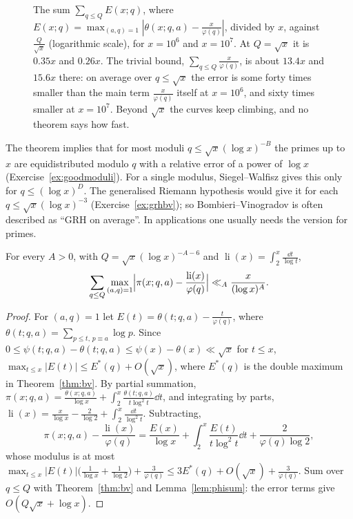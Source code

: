 \begin{figure}[ht]
\centering
{}
\caption{The sum $\sum_{q\le Q}E(x;q)$, where $E(x;q)=\max_{(a,q)=1}|\theta(x;q,a)-\frac x{\varphi(q)}|$, divided by $x$, against $\frac Q{\sqrt x}$ (logarithmic scale), for $x=10^6$ and $x=10^7$. At $Q=\sqrt x$ it is $0.35x$ and $0.26x$. The trivial bound, $\sum_{q\le Q}\frac x{\varphi(q)}$, is about $13.4x$ and $15.6x$ there: on average over $q\le\sqrt x$ the error is some forty times smaller than the main term $\frac x{\varphi(q)}$ itself at $x=10^6$, and sixty times smaller at $x=10^7$. Beyond $\sqrt x$ the curves keep climbing, and no theorem says how fast.}
\label{fig:bv}
\end{figure}

The theorem implies that for most moduli $q\le\sqrt x(\log x)^{-B}$ the primes up to $x$ are equidistributed modulo $q$ with a relative error of a power of $\log x$ (Exercise~\ref{ex:goodmoduli}). For a single modulus, Siegel--Walfisz gives this only for $q\le(\log x)^D$. The generalised Riemann hypothesis would give it for each $q\le\sqrt x(\log x)^{-3}$ (Exercise~\ref{ex:grhbv}); so Bombieri--Vinogradov is often described as ``GRH on average''. In applications one usually needs the version for primes.

\begin{corollary}\label{cor:bvpi}
For every $A>0$, with $Q=\sqrt x(\log x)^{-A-6}$ and $\operatorname{li}(x)=\int_2^x\frac{\dd t}{\log t}$,
\[
\sum_{q\le Q}\max_{(a,q)=1}\Bigl|\pi(x;q,a)-\frac{\operatorname{li}(x)}{\varphi(q)}\Bigr|\ll_A\frac x{(\log x)^A}.
\]
\end{corollary}
\begin{proof}
For $(a,q)=1$ let $E(t)=\theta(t;q,a)-\frac t{\varphi(q)}$, where $\theta(t;q,a)=\sum_{p\le t,\,p\equiv a}\log p$. Since $0\le\psi(t;q,a)-\theta(t;q,a)\le\psi(x)-\theta(x)\ll\sqrt x$ for $t\le x$, $\max_{t\le x}|E(t)|\le E^*(q)+O(\sqrt x)$, where $E^*(q)$ is the double maximum in Theorem~\ref{thm:bv}. By partial summation,
$\pi(x;q,a)=\frac{\theta(x;q,a)}{\log x}+\int_2^x\frac{\theta(t;q,a)}{t\log^2t}\dd t$, and integrating by parts, $\operatorname{li}(x)=\frac x{\log x}-\frac2{\log2}+\int_2^x\frac{\dd t}{\log^2t}$. Subtracting,
\[
\pi(x;q,a)-\frac{\operatorname{li}(x)}{\varphi(q)}=\frac{E(x)}{\log x}+\int_2^x\frac{E(t)}{t\log^2t}\dd t+\frac2{\varphi(q)\log2},
\]
whose modulus is at most $\max_{t\le x}|E(t)|\bigl(\frac1{\log x}+\frac1{\log2}\bigr)+\frac3{\varphi(q)}\le3E^*(q)+O(\sqrt x)+\frac3{\varphi(q)}$. Sum over $q\le Q$ with Theorem~\ref{thm:bv} and Lemma~\ref{lem:phisum}: the error terms give $O(Q\sqrt x+\log x)$.
\end{proof}

